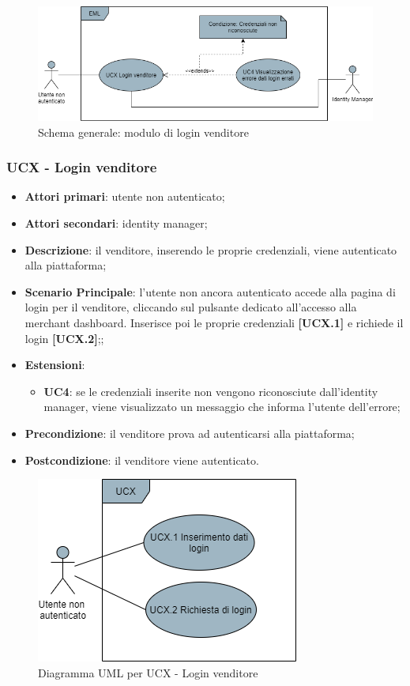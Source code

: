 \begin{figure}[H]
\centering
\includegraphics[scale=0.6]{res/UseCase/Immagini/LoginVenditore}
\caption{Schema generale: modulo di login venditore}
\end{figure}

\subsubsection{UCX - Login venditore}
\begin{itemize}
\item \textbf{Attori primari}: utente non autenticato;
\item \textbf{Attori secondari}: identity manager;
\item \textbf{Descrizione}: il venditore, inserendo le proprie credenziali, viene autenticato alla piattaforma;
\item \textbf{Scenario Principale}: l'utente non ancora autenticato accede alla pagina di login per il venditore, cliccando sul pulsante dedicato all'accesso alla merchant dashboard. Inserisce poi le proprie credenziali \textbf{[UCX.1]} e richiede il login \textbf{[UCX.2]};;
\item \textbf{Estensioni}:
\begin{itemize}
	\item \textbf{UC4}: se le credenziali inserite non vengono riconosciute dall'identity manager, viene visualizzato un messaggio che informa l'utente dell'errore;
\end{itemize}
\item \textbf{Precondizione}: il venditore prova ad autenticarsi alla piattaforma;
\item \textbf{Postcondizione}: il venditore viene autenticato.
\end{itemize}

\begin{figure}[H]
\centering
\includegraphics[scale=0.6]{res/UseCase/Immagini/LoginVenditoreSottocasi}
\caption{Diagramma UML per UCX - Login venditore}
\end{figure}

